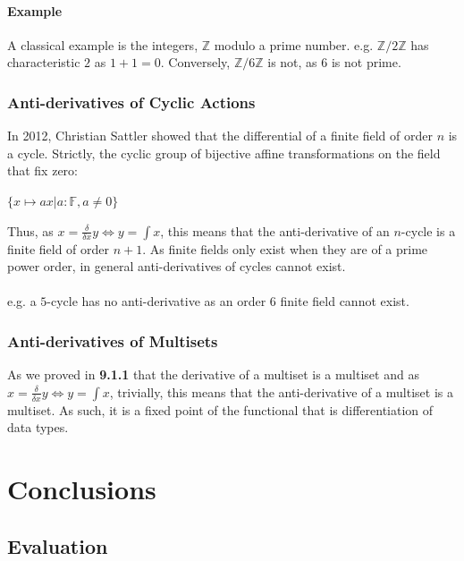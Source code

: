 \documentclass[12pt]{report}
\begin{document}
\subsection*{Example}
A classical example is the integers, $\mathbb{Z}$ modulo a prime number. e.g. $\mathbb{Z}/2\mathbb{Z}$ has characteristic $2$ as $1 + 1 = 0$. Conversely, $\mathbb{Z}/6\mathbb{Z}$ is not, as $6$ is not prime.

\section{Anti-derivatives of Cyclic Actions}
In 2012, Christian Sattler showed that the differential of a finite field of order $n$ is a cycle\cite{cycle}. Strictly, the cyclic group of bijective affine transformations on the field that fix zero:
\begin{center}
$\{x \mapsto ax | a : \mathbb{F}, a \neq 0\}$
\end{center}
Thus, as $x = \frac{\delta}{\delta x} y \Leftrightarrow y = \int x$, this means that the anti-derivative of an $n$-cycle is a finite field of order $n+1$. As finite fields only exist when they are of a prime power order, in general anti-derivatives of cycles cannot exist. \\
\\
e.g. a $5$-cycle has no anti-derivative as an order 6 finite field cannot exist.
\section{Anti-derivatives of Multisets}
As we proved in \textbf{9.1.1} that the derivative of a multiset is a multiset and as $x = \frac{\delta}{\delta x} y \Leftrightarrow y = \int x$, trivially, this means that the anti-derivative of a multiset is a multiset. As such, it is a fixed point of the functional that is differentiation of data types.






\part{Conclusions}
\chapter{Evaluation}
\end{document}
